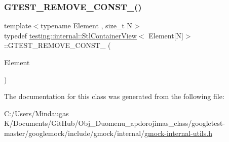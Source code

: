 \mbox{\label{classtesting_1_1internal_1_1_stl_container_view_3_01_element[_n]_4_af8c1aa62de6f8a5d3126c7b3badfefdb}} 
\subsubsection{\texorpdfstring{GTEST\_REMOVE\_CONST\_()}{GTEST\_REMOVE\_CONST\_()}\hspace{0.1cm}{\footnotesize\ttfamily [3/3]}}
{\footnotesize\ttfamily template$<$typename Element , size\+\_\+t N$>$ \\
typedef \mbox{\hyperlink{classtesting_1_1internal_1_1_stl_container_view}{testing\+::internal\+::\+Stl\+Container\+View}}$<$ Element\mbox{[}N\mbox{]}$>$\+::G\+T\+E\+S\+T\+\_\+\+R\+E\+M\+O\+V\+E\+\_\+\+C\+O\+N\+S\+T\+\_\+ (\begin{DoxyParamCaption}\item[{Element}]{ }\end{DoxyParamCaption})}



The documentation for this class was generated from the following file\+:\begin{DoxyCompactItemize}
\item 
C\+:/\+Users/\+Mindaugas K/\+Documents/\+Git\+Hub/\+Obj\+\_\+\+Duomenu\+\_\+apdorojimas\+\_\+class/googletest-\/master/googlemock/include/gmock/internal/\mbox{\hyperlink{googletest-master_2googlemock_2include_2gmock_2internal_2gmock-internal-utils_8h}{gmock-\/internal-\/utils.\+h}}\end{DoxyCompactItemize}
